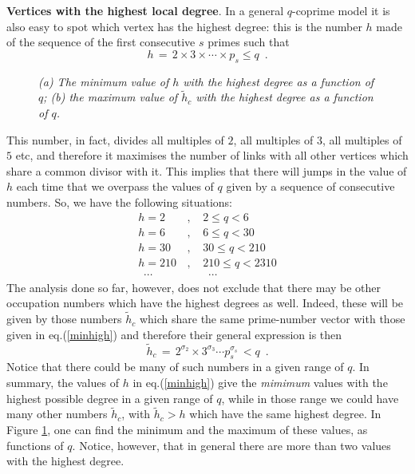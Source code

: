 \documentclass[aps,pra,superscriptaddress]{revtex4}
\newcommand\be            {\begin{equation}}
\newcommand\ee            {\end{equation}}
\renewcommand{\(}{\left(}
\renewcommand{\)}{\right)}
\renewcommand{\[}{\left[}
\renewcommand{\]}{\right]}
\begin{document}
\vspace{3mm}
\noindent
{\bf Vertices with the highest local degree}. 
In a general $q$-coprime model it is also easy to spot which vertex has the highest degree: this is the number $h$ made of the sequence 
of the first consecutive $s$ primes such that 
\be 
h \,=\, 2 \times 3 \times \cdots \times p_s \leq q \,\,\,.
\label{highest}
\ee
\begin{figure}[b]
\caption{{\em (a) The minimum value of $h$ with the highest degree as a function of $q$; 
(b) the maximum value of $\tilde h_c$ with the highest degree as a function of $q$.}}
\label{MinMax}
\end{figure}
\noindent
This number, in fact, divides all multiples of $2$, all multiples of $3$, all multiples of $5$ etc, and therefore it maximises the number of links 
with all other vertices which share a common divisor with it. This implies that there will jumps in the value of $h$ each time that we overpass 
the values of $q$ given by a sequence of consecutive numbers. So, we have the following situations: 
\be
\begin{array}{lll}
h = 2 \, &, &   \,\, 2 \leq q < 6 \\
h = 6 \, &, &   \,\, 6 \leq q < 30 \\
h =30 \, &, & \,\, 30 \leq q < 210 \\
h = 210 \, &, & \,\, 210 \leq q < 2310 \\
\,\,\,\cdots &  & \,\,\, \,\,\cdots 
\end{array}
\label{minhigh}
\ee
The analysis done so far, however, does not exclude that there may be other occupation numbers which have the highest degrees as well. Indeed, these will be given by those numbers $\tilde h_c$ which share the same prime-number vector with those given in eq.(\ref{minhigh}) and therefore their general expression is 
then 
\be 
\tilde h_c \,=\, 2^{\sigma_2} \times 3^{\sigma_3} \cdots p_s^{\sigma_s} \,< q \,\,\,.
\ee
Notice that there could be many of such numbers in a given range of $q$. In summary, the values of $h$ in eq.(\ref{minhigh}) 
give the {\em mimimum} values with the highest possible degree in a given range of $q$, while in those range we could have many 
other numbers $\tilde h_c$, with $\tilde h_c > h$ which have the same highest degree. In Figure \ref{MinMax}, one can find 
the minimum and the maximum of these values, as functions of $q$. Notice, however, that in general there are more than two values with the 
highest degree.   
\end{document}
